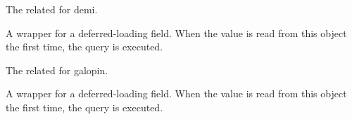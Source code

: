 \documentclass[letterpaper,10pt,english]{sphinxmanual}
\begin{document}
\begin{fulllineitems}
\begin{fulllineitems}
\end{fulllineitems}


\begin{fulllineitems}
\label{\detokenize{modules/models:gestion.models.Keg.demi}}
The related {\hyperref[\detokenize{modules/models:gestion.models.Product}]{}} for demi.

\end{fulllineitems}


\begin{fulllineitems}
\label{\detokenize{modules/models:gestion.models.Keg.demi_id}}
A wrapper for a deferred-loading field. When the value is read from this
object the first time, the query is executed.

\end{fulllineitems}


\begin{fulllineitems}
\label{\detokenize{modules/models:gestion.models.Keg.galopin}}
The related {\hyperref[\detokenize{modules/models:gestion.models.Product}]{}} for galopin.

\end{fulllineitems}


\begin{fulllineitems}
\label{\detokenize{modules/models:gestion.models.Keg.galopin_id}}
A wrapper for a deferred-loading field. When the value is read from this
object the first time, the query is executed.

\end{fulllineitems}



\end{fulllineitems}
\end{document}
